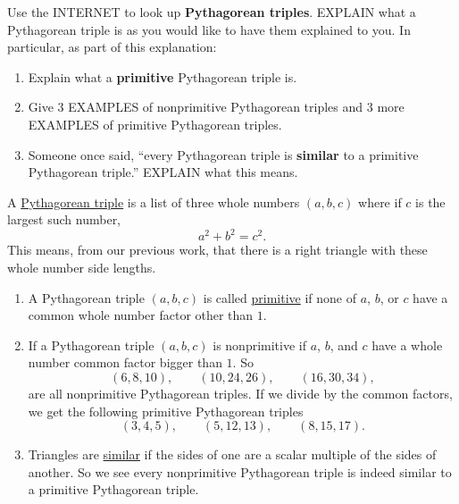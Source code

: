 \documentclass[noauthor,nooutcomes,handout]{ximera}
\begin{document}
\begin{question}
  Use the INTERNET to look up \textbf{Pythagorean triples}. EXPLAIN
  what a Pythagorean triple is as you would like to have them
  explained to you. In particular, as part of this explanation:
  \begin{enumerate}
    \item Explain what a \textbf{primitive} Pythagorean triple is.
    \item Give $3$ EXAMPLES of nonprimitive Pythagorean triples and
      $3$ more EXAMPLES of primitive Pythagorean triples.
    \item Someone once said, ``every Pythagorean triple is
      \textbf{similar} to a primitive Pythagorean triple.'' EXPLAIN
      what this means.
  \end{enumerate}
  \begin{freeResponse}
    A \underline{Pythagorean triple} is a list of three whole numbers
    $(a,b,c)$ where if $c$ is the largest such number,
    \[
    a^2 + b^2 = c^2.
    \]
    This means, from our previous work, that there is a right triangle
    with these whole number side lengths.
    \begin{enumerate}
    \item A Pythagorean triple $(a,b,c)$ is called \underline{primitive} if
    none of $a$, $b$, or $c$ have a common whole number factor other
    than $1$.
    \item If a Pythagorean triple $(a,b,c)$ is nonprimitive if $a$,
      $b$, and $c$ have a whole number common factor bigger than
      $1$. So
    \[
    (6,8,10), \qquad (10,24,26), \qquad (16,30,34), 
    \]
    are all nonprimitive Pythagorean triples. If we divide by the
    common factors, we get the following primitive Pythagorean
    triples
    \[
    (3,4,5), \qquad (5,12,13), \qquad (8,15,17).
    \]

  \item Triangles are \underline{similar} if the sides of one are a scalar
    multiple of the sides of another. So we see every nonprimitive
    Pythagorean triple is indeed similar to a primitive Pythagorean
    triple.
    \end{enumerate}
  \end{freeResponse}
\end{question}
\mynewpage
\end{document}
